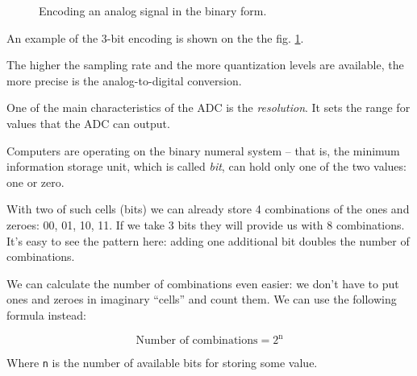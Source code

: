 \documentclass[../sparc.tex]{subfiles}
\begin{document}
\begin{enumerate}
\begin{figure}[h]
    \caption{Encoding an analog signal in the binary form.}
    \label{fig:adc-encoding}
  \end{figure}

  An example of the 3-bit encoding is shown on the the
  fig. \ref{fig:adc-encoding}.

  The higher the sampling rate and the more quantization levels are available,
  the more precise is the analog-to-digital conversion.

\end{enumerate}

One of the main characteristics of the ADC is the \emph{resolution}.  It sets
the range for values that the ADC can output.


Computers are operating on the binary numeral system -- that is, the minimum
information storage unit, which is called \emph{bit}, can hold only one of the
two values: one or zero.

With two of such cells (bits) we can already store 4 combinations of the ones
and zeroes: 00, 01, 10, 11.  If we take 3 bits they will provide us with 8
combinations.  It's easy to see the pattern here: adding one additional bit
doubles the number of combinations.

We can calculate the number of combinations even easier: we don't have to put
ones and zeroes in imaginary ``cells'' and count them.  We can use the following
formula instead:

\begin{equation}
  \mbox{Number of combinations} = 2^{\mbox{n}}
\end{equation}

Where \texttt{n} is the number of available bits for storing some value.
\end{document}
